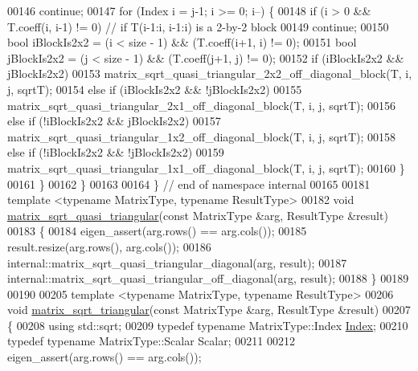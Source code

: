 \begin{DoxyCode}
00146     \textcolor{keywordflow}{continue};
00147     \textcolor{keywordflow}{for} (Index i = j-1; i >= 0; i--) \{
00148       \textcolor{keywordflow}{if} (i > 0 && T.coeff(i, i-1) != 0)  \textcolor{comment}{// if T(i-1:i, i-1:i) is a 2-by-2 block}
00149     \textcolor{keywordflow}{continue};
00150       \textcolor{keywordtype}{bool} iBlockIs2x2 = (i < size - 1) && (T.coeff(i+1, i) != 0);
00151       \textcolor{keywordtype}{bool} jBlockIs2x2 = (j < size - 1) && (T.coeff(j+1, j) != 0);
00152       \textcolor{keywordflow}{if} (iBlockIs2x2 && jBlockIs2x2) 
00153         matrix\_sqrt\_quasi\_triangular\_2x2\_off\_diagonal\_block(T, i, j, sqrtT);
00154       \textcolor{keywordflow}{else} \textcolor{keywordflow}{if} (iBlockIs2x2 && !jBlockIs2x2) 
00155         matrix\_sqrt\_quasi\_triangular\_2x1\_off\_diagonal\_block(T, i, j, sqrtT);
00156       \textcolor{keywordflow}{else} \textcolor{keywordflow}{if} (!iBlockIs2x2 && jBlockIs2x2) 
00157         matrix\_sqrt\_quasi\_triangular\_1x2\_off\_diagonal\_block(T, i, j, sqrtT);
00158       \textcolor{keywordflow}{else} \textcolor{keywordflow}{if} (!iBlockIs2x2 && !jBlockIs2x2) 
00159         matrix\_sqrt\_quasi\_triangular\_1x1\_off\_diagonal\_block(T, i, j, sqrtT);
00160     \}
00161   \}
00162 \}
00163 
00164 \} \textcolor{comment}{// end of namespace internal}
00165 
00181 \textcolor{keyword}{template} <\textcolor{keyword}{typename} MatrixType, \textcolor{keyword}{typename} ResultType> 
00182 \textcolor{keywordtype}{void} \hyperlink{namespace_eigen_a2f490197e16df831683018e383e29346}{matrix\_sqrt\_quasi\_triangular}(\textcolor{keyword}{const} MatrixType &arg, ResultType &result)
00183 \{
00184   eigen\_assert(arg.rows() == arg.cols());
00185   result.resize(arg.rows(), arg.cols());
00186   internal::matrix\_sqrt\_quasi\_triangular\_diagonal(arg, result);
00187   internal::matrix\_sqrt\_quasi\_triangular\_off\_diagonal(arg, result);
00188 \}
00189 
00190 
00205 \textcolor{keyword}{template} <\textcolor{keyword}{typename} MatrixType, \textcolor{keyword}{typename} ResultType> 
00206 \textcolor{keywordtype}{void} \hyperlink{namespace_eigen_ae51c91f920f6ea4a7f6f72caa1e8249f}{matrix\_sqrt\_triangular}(\textcolor{keyword}{const} MatrixType &arg, ResultType &result)
00207 \{
00208   \textcolor{keyword}{using} std::sqrt;
00209   \textcolor{keyword}{typedef} \textcolor{keyword}{typename} MatrixType::Index \hyperlink{namespace_eigen_a62e77e0933482dafde8fe197d9a2cfde}{Index};
00210       \textcolor{keyword}{typedef} \textcolor{keyword}{typename} MatrixType::Scalar Scalar;
00211 
00212   eigen\_assert(arg.rows() == arg.cols());

\end{DoxyCode}
